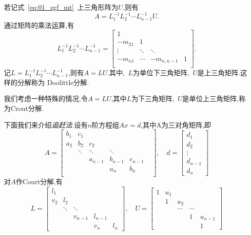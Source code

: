 若记式~\eqref{eq:01_zgf_mt}~上三角形阵为$U$,则有
\begin{equation*}
A=L_1^{-1}L_2^{-1}\cdots L_{n-1}^{-1}U.
\end{equation*}
通过矩阵的乘法运算,有
\begin{equation}
 L_1^{-1}L_2^{-1}\cdots L_{n-1}^{-1}=
 \begin{bmatrix}
 1 	 &	   &	         & \\
 -m_{21} &   1     &             & \\
 \vdots  &  \ddots &  \ddots     & \\
 -m_{n1} &  \cdots &  -m_{n,n-1} & 1 \\
 \end{bmatrix}.
\end{equation}
记$L=L_1^{-1}L_2^{-1}\cdots L_{n-1}^{-1}$,则有$A=LU$.其中,~$L$为单位下三角矩阵,~$U$是上三角矩阵.这样的分解称为
Doolittle分解.\par
我们考虑一种特殊的情况,令$A=LU$,其中$L$为下三角矩阵,~$U$是单位上三角矩阵,称为Crout分解.\par
下面我们来介绍\emph{追赶法}.设有$n$阶方程组$Ax=d$,其中A为三对角矩阵,即
\begin{equation}
A=\begin{bmatrix}
  b_1 & c_1    &        &         &    & \\
  a_2 & b_2    & c_2    &         &    & \\
      & \ddots & \ddots & \ddots  &    & \\
      &        & a_{n-1} & b_{n-1} & c_{n-1} \\
      &        &         &  a_n   &   b_n    \\
  \end{bmatrix}
  ,\quad
  d=\begin{bmatrix}
     d_1 \\
     d_2 \\
     \vdots \\
     d_{n-1} \\
     d_n
    \end{bmatrix}
\end{equation}
对$A$作Court分解,有
\begin{equation}
L=\begin{bmatrix}
  l_1 &   	&     	     &   &   \\
  v_2 & l_2 	&	     &   &   \\
      & \ddots  &  \ddots    &   &  \\
      &         &   v_{n-1}  & l_{n-1} & \\
      &         &            &   v_n  &  l_n 
  \end{bmatrix}
,\quad
U=\begin{bmatrix}
   1  &  u_1 \\
      &   1  &   u_2  \\
      &      &   \cdots  &  \cdots  \\
      &      &           &    1    &   u_{n-1} \\
      &      &           &         &       1   
  \end{bmatrix}
\end{equation}
